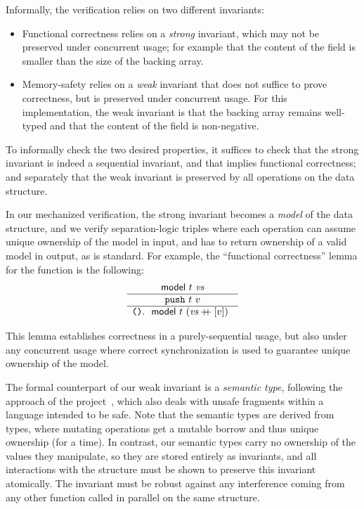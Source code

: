 Informally, the verification relies on two different invariants:
\begin{itemize}
\item Functional correctness relies on a \emph{strong} invariant,
  which may not be preserved under concurrent usage; for example that
  the content of the  field is smaller than the
  size of the backing array.
\item Memory-safety relies on a \emph{weak} invariant that does not
  suffice to prove correctness, but is preserved under concurrent
  usage. For this  implementation, the weak
  invariant is that the backing array remains well-typed and that the
  content of the  field is non-negative.
\end{itemize}
To informally check the two desired properties, it suffices to check
that the strong invariant is indeed a sequential invariant, and that
implies functional correctness; and separately that the weak invariant
is preserved by all operations on the data structure.

In our mechanized verification, the strong invariant becomes a \emph{model}
of the data structure, and we verify separation-logic triples where
each operation can assume unique ownership of the model in input, and
has to return ownership of a valid model in output, as is
standard. For example, the ``functional correctness'' lemma for the
 function is the following:
\[
  \begin{array}{c} \begin{array}{c} 
    \textsf{\upshape model}\ t\ \textit{vs}
   \end{array} \\ \hline 
    \texttt{push}\ t\ v
   \\ \hline 
    \texttt{()}
   \ldotp \begin{array}[t]{c} 
    \textsf{\upshape model}\ t\ (\textit{vs} \mathbin{+\mkern-7mu+} [v])
   \end{array} \end{array}
\]

This lemma establishes correctness in a purely-sequential usage, but
also under any concurrent usage where correct synchronization is used to
guarantee unique ownership of the model.

The formal counterpart of our weak invariant is a \emph{semantic type}, following the approach of the \RustBelt project~\citep{DBLP:journals/pacmpl/0002JKD18}, which also deals with unsafe fragments within a language intended to be safe. Note that the \RustBelt semantic types are derived from \Rust types, where mutating operations get a mutable borrow and thus unique ownership (for a time). In contrast, our semantic types carry no ownership of the values they manipulate, so they are stored entirely as invariants, and all interactions with the structure must be shown to preserve this invariant atomically. The invariant must be robust against any interference coming from any other function called in parallel on the same structure.

